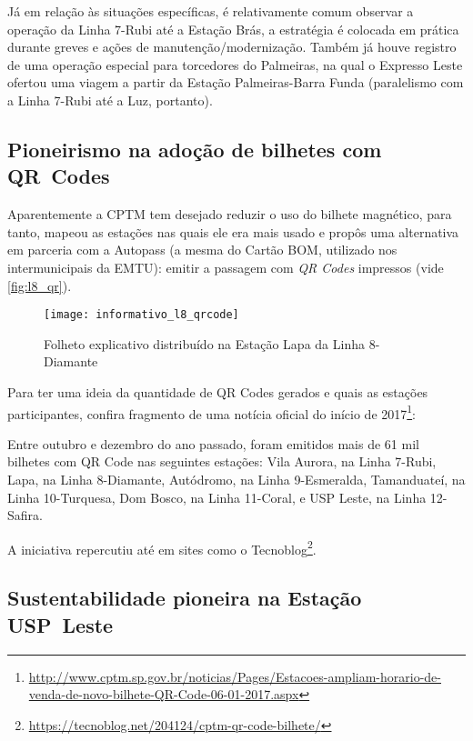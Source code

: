 \documentclass[11pt,fleqn]{book} %
\begin{document}
Já em relação às situações específicas, é relativamente comum observar a operação da Linha 7-Rubi até a Estação Brás, a estratégia é colocada em prática durante greves e ações de manutenção/modernização. Também já houve registro de uma operação especial para torcedores do Palmeiras, na qual o Expresso Leste ofertou uma viagem a partir da Estação Palmeiras-Barra Funda (paralelismo com a Linha 7-Rubi até a Luz, portanto).

\subsection{Pioneirismo na adoção de bilhetes com QR Codes}

Aparentemente a CPTM tem desejado reduzir o uso do bilhete magnético, para tanto, mapeou as estações nas quais ele era mais usado e propôs uma alternativa em parceria com a Autopass (a mesma do Cartão BOM, utilizado nos intermunicipais da EMTU): emitir a passagem com \textit{QR Codes} impressos (vide \autoref{fig:l8_qr}).

\begin{figure}[b!]
	\centering
	\caption[Informativo QR Codes]{Folheto explicativo distribuído na Estação Lapa da Linha 8-Diamante}
	\texttt{[image: informativo\_l8\_qrcode]}
	\label{fig:l8_qr}
\end{figure}

Para ter uma ideia da quantidade de QR Codes gerados e quais as estações participantes, confira fragmento de uma notícia oficial do início de 2017\footnote{\url{http://www.cptm.sp.gov.br/noticias/Pages/Estacoes-ampliam-horario-de-venda-de-novo-bilhete-QR-Code-06-01-2017.aspx}}:

\begin{citacao}
	Entre outubro e dezembro do ano passado, foram emitidos mais de 61 mil bilhetes com QR Code nas seguintes estações: Vila Aurora, na Linha 7-Rubi, Lapa, na Linha 8-Diamante, Autódromo, na Linha 9-Esmeralda, Tamanduateí, na Linha 10-Turquesa, Dom Bosco, na Linha 11-Coral, e USP Leste, na Linha 12-Safira.
\end{citacao}

A iniciativa repercutiu até em sites como o Tecnoblog\footnote{\url{https://tecnoblog.net/204124/cptm-qr-code-bilhete/}}.

\subsection{Sustentabilidade pioneira na Estação USP Leste}
\end{document}
